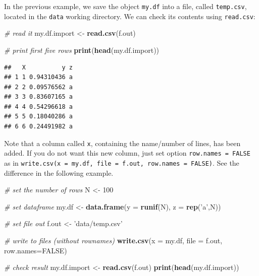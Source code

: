 \documentclass[11pt,]{book}
\newenvironment{Shaded}{\begin{snugshade}}{\end{snugshade}}
\newcommand{\KeywordTok}[1]{\textcolor[rgb]{0.27,0.27,0.27}{\textbf{#1}}}
\newcommand{\DataTypeTok}[1]{\textcolor[rgb]{0.27,0.27,0.27}{#1}}
\newcommand{\DecValTok}[1]{\textcolor[rgb]{0.06,0.06,0.06}{#1}}
\newcommand{\StringTok}[1]{\textcolor[rgb]{0.5,0.5,0.5}{#1}}
\newcommand{\CommentTok}[1]{\textcolor[rgb]{0.56,0.35,0.01}{\textit{#1}}}
\newcommand{\OtherTok}[1]{\textcolor[rgb]{0.56,0.35,0.01}{#1}}
\newcommand{\NormalTok}[1]{#1}
\begin{document}
In the previous example, we save the object \texttt{my.df} into a file,
called \texttt{temp.csv}, located in the \texttt{data} working
directory. We can check its contents using \texttt{read.csv}:

\begin{Shaded}
\begin{Highlighting}[]
\CommentTok{# read it}
\NormalTok{my.df.import <-}\StringTok{ }\KeywordTok{read.csv}\NormalTok{(f.out)}

\CommentTok{# print first five rows}
\KeywordTok{print}\NormalTok{(}\KeywordTok{head}\NormalTok{(my.df.import))}
\end{Highlighting}
\end{Shaded}

\begin{verbatim}
##   X          y z
## 1 1 0.94310436 a
## 2 2 0.09576562 a
## 3 3 0.83607165 a
## 4 4 0.54296618 a
## 5 5 0.18040286 a
## 6 6 0.24491982 a
\end{verbatim}

Note that a column called \texttt{x}, containing the name/number of
lines, has been added. If you do not want this new column, just set
option \texttt{row.names\ =\ FALSE} as in
\texttt{write.csv(x\ =\ my.df,\ file\ =\ f.out,\ row.names\ =\ FALSE)}.
See the difference in the following example.

\begin{Shaded}
\begin{Highlighting}[]
\CommentTok{# set the number of rows}
\NormalTok{N <-}\StringTok{ }\DecValTok{100}

\CommentTok{# set dataframe}
\NormalTok{my.df <-}\StringTok{ }\KeywordTok{data.frame}\NormalTok{(}\DataTypeTok{y =} \KeywordTok{runif}\NormalTok{(N), }\DataTypeTok{z =} \KeywordTok{rep}\NormalTok{(}\StringTok{'a'}\NormalTok{,N))}

\CommentTok{# set file out}
\NormalTok{f.out <-}\StringTok{ 'data/temp.csv'}

\CommentTok{# write to files (without rownames)}
\KeywordTok{write.csv}\NormalTok{(}\DataTypeTok{x =}\NormalTok{ my.df, }\DataTypeTok{file =}\NormalTok{ f.out, }\DataTypeTok{row.names=}\OtherTok{FALSE}\NormalTok{)}

\CommentTok{# check result}
\NormalTok{my.df.import <-}\StringTok{ }\KeywordTok{read.csv}\NormalTok{(f.out)}
\KeywordTok{print}\NormalTok{(}\KeywordTok{head}\NormalTok{(my.df.import))}
\end{Highlighting}
\end{Shaded}
\end{document}
